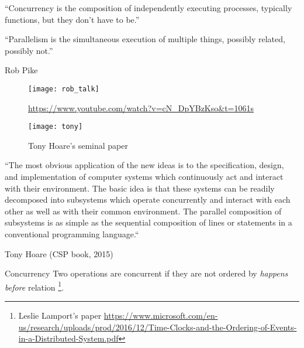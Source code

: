 \documentclass[10pt]{beamer}
\begin{document}
\begin{frame}[fragile]
	``Concurrency is the composition of independently executing processes, typically functions, but they don't have to be.''

	``Parallelism is the simultaneous execution of multiple things, possibly related, possibly not.''

Rob Pike

\end{frame}
\begin{frame}[fragile]
	\begin{figure}
		\texttt{[image: rob\_talk]}
		\caption{\url{https://www.youtube.com/watch?v=cN_DpYBzKso&t=1061s}}
	\end{figure}
\end{frame}

\begin{frame}[fragile]
	\begin{figure}
		\texttt{[image: tony]}
		\caption{Tony Hoare's seminal paper}
	\end{figure}
\end{frame}
\begin{frame}[fragile]
``The most obvious application of the new ideas is to the specification, design,
and implementation of computer systems which continuously act and
interact with their environment. The basic idea is that these systems can be
readily decomposed into subsystems which operate concurrently and interact
with each other as well as with their common environment. The parallel composition
of subsystems is as simple as the sequential composition of lines or
statements in a conventional programming language.``

	Tony Hoare (CSP book, 2015)
\end{frame}


\begin{frame}[fragile]
	\begin{alertblock}{Concurrency}
		Two operations are concurrent if they are not ordered by \emph{happens before} relation%
		\footnote{Leslie Lamport's paper \url{https://www.microsoft.com/en-us/research/uploads/prod/2016/12/Time-Clocks-and-the-Ordering-of-Events-in-a-Distributed-System.pdf}}.
	\end{alertblock}
	

\end{frame}
\end{document}
